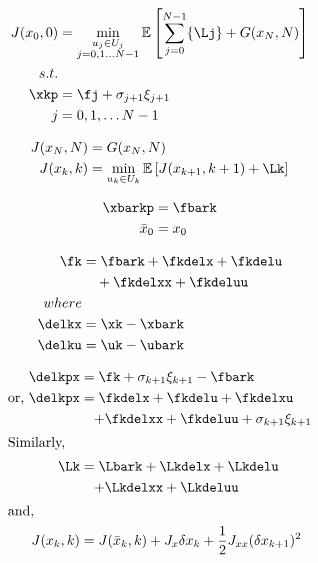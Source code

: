 \documentclass[varwidth]{standalone}
\providecommand{\Jzero}{J(x_0, 0)}
\providecommand{\Jk}{J(x_k, k)}
\providecommand{\JN}{J(x_N, N)}
\providecommand{\Jbark}{J(\bar{x}_k, k)}
\providecommand{\Jkp}{J(x_{k+1}, k+1)}
\providecommand{\Jkdelx}{J_x \delta x_{k}}
\providecommand{\Jkdelxx}{\frac{1}{2} J_{xx} (\delta x_{k+1})^2}
\providecommand{\GN}{G(x_N, N)}
\providecommand{\noisekp}{\sigma_{k+1} \xi_{k+1}}
\providecommand{\noisejp}{\sigma_{j+1} \xi_{j+1}}
\begin{document}
\begin{minipage}{0.8\linewidth}

    \begin{align}
        \Jzero &= \min_{
            \substack{
                u_j \in U_j \\
                j = 0, 1 \dots N-1 \\
            }
        }
        \mathbb{E} \left[ \sum_{j=0}^{N-1} \{\Lj\} + \GN\right] \nonumber\\
        s.t. &{} \\
        \xkp &= \fj + \noisejp \nonumber\\
        j &= 0, 1, \dots N-1 \nonumber
    \end{align}

    \begin{align}
        \JN &= \GN  \\
        \Jk &= \min_{u_k \in U_k} \mathbb{E} \left[ 
            \Jkp + \Lk 
        \right]
    \end{align}

    \begin{align}
        \xbarkp &= \fbark \\
        \bar{x}_0 &= x_0 \nonumber
    \end{align}

    \begin{align}
        {\fk} &= {\fbark + \fkdelx + \fkdelu} \\
        {}  &\quad + {\fkdelxx + \fkdeluu} \nonumber\\
        {where} & {}\nonumber\\
        {\delkx} &= {\xk - \xbark} \nonumber\\
        {\delku} &= {\uk - \ubark} \nonumber
    \end{align}

\end{minipage}

\begin{minipage}{0.8\linewidth}
    \begin{align}
        {\delkpx} &= {\fk + \noisekp - \fbark} \nonumber\\
        {\text{or, } \delkpx} &= {\fkdelx + \fkdelu + \fkdelxu} \\
        {} &\quad {+ \fkdelxx + \fkdeluu + \noisekp} \nonumber \\
        \intertext{Similarly, }
        {\Lk} &= {\Lbark + \Lkdelx + \Lkdelu} \nonumber\\
        {} &\quad {+ \Lkdelxx + \Lkdeluu} \\
        \intertext{and, }
        {\Jk} &= {\Jbark + \Jkdelx + \Jkdelxx}
    \end{align}
\end{minipage}
\end{document}
